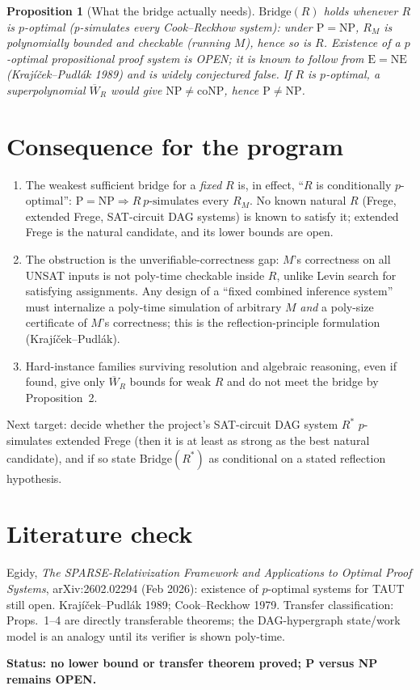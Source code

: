 \documentclass{article}
\newtheorem{prop}{Proposition}
\begin{document}
\begin{prop}[What the bridge actually needs]
$\mathrm{Bridge}(R)$ holds whenever $R$ is $p$-optimal (p-simulates every Cook--Reckhow system): under $\mathrm P=\mathrm{NP}$, $R_M$ is polynomially bounded and checkable (running $M$), hence so is $R$. Existence of a $p$-optimal propositional proof system is OPEN; it is known to follow from $\mathrm{E}=\mathrm{NE}$ (Krají\v cek--Pud\-l\'ak 1989) and is widely conjectured false. If $R$ is $p$-optimal, a superpolynomial $\overline W_R$ would give $\mathrm{NP}\ne\mathrm{coNP}$, hence $\mathrm P\ne\mathrm{NP}$.
\end{prop}

\section*{Consequence for the program}
\begin{enumerate}
\item The weakest sufficient bridge for a \emph{fixed} $R$ is, in effect, ``$R$ is conditionally $p$-optimal'': $\mathrm P=\mathrm{NP}\Rightarrow R\ p\text{-simulates every }R_M$. No known natural $R$ (Frege, extended Frege, SAT-circuit DAG systems) is known to satisfy it; extended Frege is the natural candidate, and its lower bounds are open.
\item The obstruction is the unverifiable-correctness gap: $M$'s correctness on all UNSAT inputs is not poly-time checkable inside $R$, unlike Levin search for satisfying assignments. Any design of a ``fixed combined inference system'' must internalize a poly-time simulation of arbitrary $M$ \emph{and} a poly-size certificate of $M$'s correctness; this is the reflection-principle formulation (Krajíček--Pudlák).
\item Hard-instance families surviving resolution and algebraic reasoning, even if found, give only $\overline W_R$ bounds for weak $R$ and do not meet the bridge by Proposition~2.
\end{enumerate}
Next target: decide whether the project's SAT-circuit DAG system $R^\ast$ $p$-simulates extended Frege (then it is at least as strong as the best natural candidate), and if so state Bridge$(R^\ast)$ as conditional on a stated reflection hypothesis.

\section*{Literature check}
Egidy, \emph{The SPARSE-Relativization Framework and Applications to Optimal Proof Systems}, arXiv:2602.02294 (Feb 2026): existence of $p$-optimal systems for TAUT still open. Krajíček--Pudlák 1989; Cook--Reckhow 1979. Transfer classification: Props.~1--4 are directly transferable theorems; the DAG-hypergraph state/work model is an analogy until its verifier is shown poly-time.

\textbf{Status: no lower bound or transfer theorem proved; P versus NP remains OPEN.}
\end{document}
